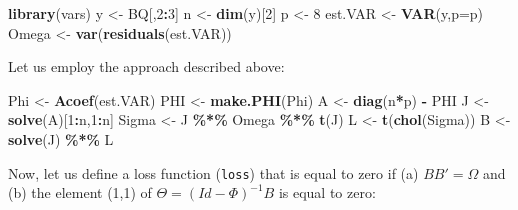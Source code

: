 \documentclass[
  12pt,
]{book}
\newenvironment{Shaded}{\begin{snugshade}}{\end{snugshade}}
\newcommand{\AttributeTok}[1]{\textcolor[rgb]{0.13,0.29,0.53}{#1}}
\newcommand{\DecValTok}[1]{\textcolor[rgb]{0.00,0.00,0.81}{#1}}
\newcommand{\FunctionTok}[1]{\textcolor[rgb]{0.13,0.29,0.53}{\textbf{#1}}}
\newcommand{\NormalTok}[1]{#1}
\newcommand{\OtherTok}[1]{\textcolor[rgb]{0.56,0.35,0.01}{#1}}
\newcommand{\SpecialCharTok}[1]{\textcolor[rgb]{0.81,0.36,0.00}{\textbf{#1}}}
\theoremstyle{definition}
\theoremstyle{definition}
\theoremstyle{definition}
\theoremstyle{definition}
\theoremstyle{remark}
\begin{document}
\begin{Shaded}
\begin{Highlighting}[]
\FunctionTok{library}\NormalTok{(vars)}
\NormalTok{y }\OtherTok{\textless{}{-}}\NormalTok{ BQ[,}\DecValTok{2}\SpecialCharTok{:}\DecValTok{3}\NormalTok{]}
\NormalTok{n }\OtherTok{\textless{}{-}} \FunctionTok{dim}\NormalTok{(y)[}\DecValTok{2}\NormalTok{]}
\NormalTok{p }\OtherTok{\textless{}{-}} \DecValTok{8}
\NormalTok{est.VAR }\OtherTok{\textless{}{-}} \FunctionTok{VAR}\NormalTok{(y,}\AttributeTok{p=}\NormalTok{p)}
\NormalTok{Omega }\OtherTok{\textless{}{-}} \FunctionTok{var}\NormalTok{(}\FunctionTok{residuals}\NormalTok{(est.VAR))}
\end{Highlighting}
\end{Shaded}

Let us employ the approach described above:

\begin{Shaded}
\begin{Highlighting}[]
\NormalTok{Phi }\OtherTok{\textless{}{-}} \FunctionTok{Acoef}\NormalTok{(est.VAR)}
\NormalTok{PHI }\OtherTok{\textless{}{-}} \FunctionTok{make.PHI}\NormalTok{(Phi)}
\NormalTok{A }\OtherTok{\textless{}{-}} \FunctionTok{diag}\NormalTok{(n}\SpecialCharTok{*}\NormalTok{p) }\SpecialCharTok{{-}}\NormalTok{ PHI}
\NormalTok{J }\OtherTok{\textless{}{-}} \FunctionTok{solve}\NormalTok{(A)[}\DecValTok{1}\SpecialCharTok{:}\NormalTok{n,}\DecValTok{1}\SpecialCharTok{:}\NormalTok{n]}
\NormalTok{Sigma }\OtherTok{\textless{}{-}}\NormalTok{ J }\SpecialCharTok{\%*\%}\NormalTok{ Omega }\SpecialCharTok{\%*\%} \FunctionTok{t}\NormalTok{(J)}
\NormalTok{L }\OtherTok{\textless{}{-}} \FunctionTok{t}\NormalTok{(}\FunctionTok{chol}\NormalTok{(Sigma))}
\NormalTok{B }\OtherTok{\textless{}{-}} \FunctionTok{solve}\NormalTok{(J) }\SpecialCharTok{\%*\%}\NormalTok{ L}
\end{Highlighting}
\end{Shaded}

Now, let us define a loss function (\texttt{loss}) that is equal to zero if (a) \(BB'=\Omega\) and (b) the element (1,1) of \(\Theta = (Id - \Phi)^{-1} B\) is equal to zero:
\end{document}
